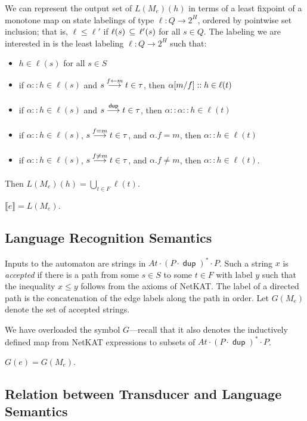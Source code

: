 \documentclass{article}
\newcommand\den[1]{\llbracket #1\rrbracket}
\newcommand\At{\ensuremath{\mathit{At}}}
\newcommand\pdup{\mathop{\mathsf{dup}}}
\renewcommand\star{^{\textstyle *}}
\renewcommand\powerset[1]{2^{#1}}
\begin{document}
We can represent the output set of $L(M_e)(h)$ in terms of a least fixpoint of a monotone map on state labelings of type $\ell:Q\to\powerset H$, ordered by pointwise set inclusion; that is, $\ell\leq\ell'$ if $\ell(s)\,\subseteq\,\ell'(s)$ for all $s\in Q$. The labeling we are interested in is the least labeling $\ell:Q\to\powerset H$ such that:
\begin{itemize}
\item
$h\in \ell(s)$ for all $s\in S$
\item
if $\alpha::h \in \ell(s)$ and $s\underset{}{\overset{f\leftarrow m}\longrightarrow}t\in\tau$, then $\alpha[m/f]::h \in \ell(t)$
\item
if $\alpha::h \in \ell(s)$ and $s\goesto{\pdup}{}t\in\tau$, then $\alpha::\alpha::h \in \ell(t)$
\item
if $\alpha::h \in \ell(s)$, $s\underset{}{\overset{f=m}\longrightarrow}t\in\tau$, and $\alpha.f=m$, then $\alpha::h \in \ell(t)$
\item
if $\alpha::h \in \ell(s)$, $s\underset{}{\overset{f\neq m}\longrightarrow}t\in\tau$, and $\alpha.f\neq m$, then $\alpha::h \in \ell(t)$.
\end{itemize}
Then $L(M_e)(h) = \bigcup_{t\in F}\ell(t)$.

\begin{theorem}
$\den e = L(M_e)$.
\end{theorem}

\subsection*{Language Recognition Semantics}

Inputs to the automaton are strings in $\At\cdot(P\cdot\pdup)\star\cdot P$. Such a string $x$ is \emph{accepted} if there is a path from some $s\in S$ to some $t\in F$ with label $y$ such that the inequality $x\leq y$ follows from the axioms of NetKAT. The label of a directed path is the concatenation of the edge labels along the path in order. Let $G(M_e)$ denote the set of accepted strings.

We have overloaded the symbol $G$---recall that it also denotes the inductively defined map from NetKAT expressions to subsets of $\At\cdot(P\cdot\pdup)\star\cdot P$.

\begin{theorem}
$G(e) = G(M_e)$.
\end{theorem}

\subsection*{Relation between Transducer and Language Semantics}
\end{document}
